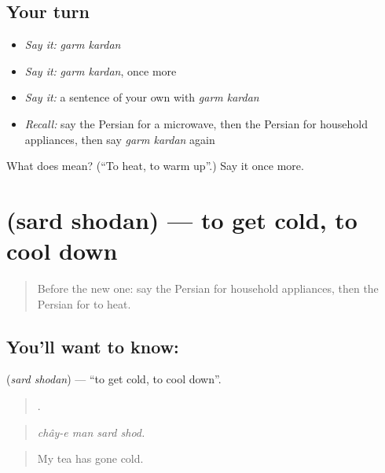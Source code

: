 \subsection*{Your turn}
\begin{itemize}
\raggedright
  \item \emph{Say it:} \emph{garm kardan}
  \item \emph{Say it:} \emph{garm kardan}, once more
  \item \emph{Say it:} a sentence of your own with \emph{garm kardan}
  \item \emph{Recall:} say the Persian for a microwave, then the Persian for household appliances, then say \emph{garm kardan} again
\end{itemize}

\begin{tcolorbox}[breakable,colback=teal!4,colframe=teal!35!black,title={Before you move on}]
What does   mean? (\textquotedblleft{}To heat, to warm up\textquotedblright{}.) Say it once more.
\end{tcolorbox}
\section[\texorpdfstring{\fa{سرد} \fa{شدن} (sard shodan)}{سرد شدن (sard shodan)}]{  (sard shodan) — to get cold, to cool down}

\label{lesson:FA-C538-sard-shodan}



\begin{quote}
Before the new one: say the Persian for household appliances, then the Persian for to heat.
\end{quote}

\subsection*{You'll want to know:  }
\textbf{ } (\emph{sard shodan}) — \textquotedblleft{}to get cold, to cool down\textquotedblright{}.

\begin{quote}
   .
\end{quote}

\begin{quote}
\emph{chây-e man sard shod.}
\end{quote}

\begin{quote}
My tea has gone cold.
\end{quote}


